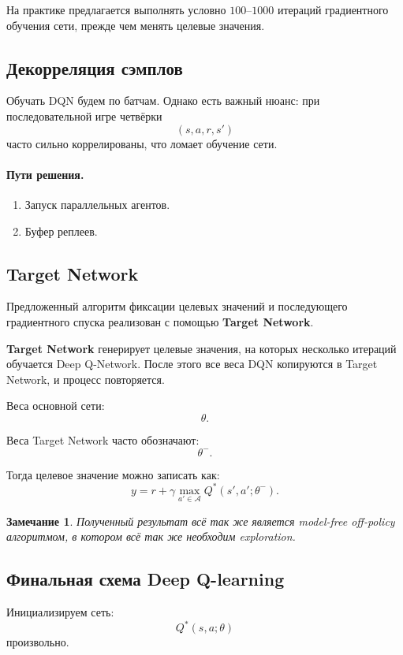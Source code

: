 \documentclass[12pt,a4paper]{article}
\newtheorem{remark}{Замечание}
\begin{document}
На практике предлагается выполнять условно $100$--$1000$ итераций градиентного обучения сети, прежде чем менять целевые значения.

\subsection{Декорреляция сэмплов}

Обучать DQN будем по батчам. Однако есть важный нюанс: при последовательной игре четвёрки
\[
(s,a,r,s')
\]
часто сильно коррелированы, что ломает обучение сети.

\paragraph{Пути решения.}

\begin{enumerate}
    \item Запуск параллельных агентов.
    \item Буфер реплеев.
\end{enumerate}

\subsection{Target Network}

Предложенный алгоритм фиксации целевых значений и последующего градиентного спуска реализован с помощью \textbf{Target Network}.

\textbf{Target Network} генерирует целевые значения, на которых несколько итераций обучается Deep Q-Network. После этого все веса DQN копируются в Target Network, и процесс повторяется.

Веса основной сети:
\[
\theta.
\]

Веса Target Network часто обозначают:
\[
\theta^-.
\]

Тогда целевое значение можно записать как:
\[
y
=
r
+
\gamma
\max_{a' \in \mathcal A}
Q^\ast(s',a';\theta^-).
\]

\begin{remark}
Полученный результат всё так же является model-free off-policy алгоритмом, в котором всё так же необходим exploration.
\end{remark}

\subsection{Финальная схема Deep Q-learning}

Инициализируем сеть:
\[
Q^\ast(s,a;\theta)
\]
произвольно.
\end{document}
